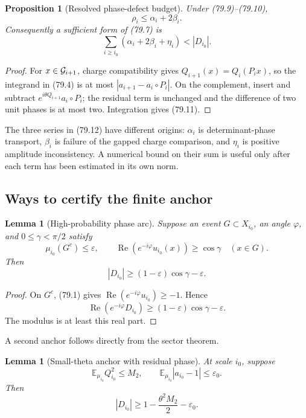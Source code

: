 \documentclass[11pt]{article}
\newtheorem{lemma}[theorem]{Lemma}
\newtheorem{proposition}[theorem]{Proposition}
\begin{document}
\begin{proposition}[Resolved phase-defect budget]
\label{prop:v11v79-budget}
Under (79.9)--(79.10),
\[
                                  \rho_i\le\alpha_i+2\beta_i. \tag{79.11}
\]
Consequently a sufficient form of (79.7) is
\[
       \sum_{i\ge i_0}(\alpha_i+2\beta_i+\eta_i)<|D_{i_0}|.  \tag{79.12}
\]
\end{proposition}

\begin{proof}
For \(x\in{\cal G}_{i+1}\), charge compatibility gives
\(Q_{i+1}(x)=Q_i(P_ix)\), so the integrand in (79.4) is at most
\(|a_{i+1}-a_i\circ P_i|\).  On the complement, insert and subtract
\(e^{i\theta Q_{i+1}}a_i\circ P_i\); the residual term is unchanged
and the difference of two unit phases is at most two.  Integration
gives (79.11).
\end{proof}

The three series in (79.12) have different origins:
\(\alpha_i\) is determinant-phase transport,
\(\beta_i\) is failure of the gapped charge comparison, and
\(\eta_i\) is positive amplitude inconsistency.  A numerical bound on
their sum is useful only after each term has been estimated in its
own norm.

\subsection{Ways to certify the finite anchor}

\begin{lemma}[High-probability phase arc]
\label{lem:v11v79-arc}
Suppose an event \(G\subset X_{i_0}\), an angle \(\varphi\), and
\(0\le\gamma<\pi/2\) satisfy
\[
 \mu_{i_0}(G^c)\le\varepsilon,\qquad
 \operatorname{Re}\!\left(e^{-i\varphi}u_{i_0}(x)\right)
                    \ge\cos\gamma\quad(x\in G).              \tag{79.13}
\]
Then
\[
 |D_{i_0}|
 \ge (1-\varepsilon)\cos\gamma-\varepsilon.                  \tag{79.14}
\]
\end{lemma}

\begin{proof}
On \(G^c\), (79.1) gives
\(\operatorname{Re}(e^{-i\varphi}u_{i_0})\ge-1\).  Hence
\[
 \operatorname{Re}(e^{-i\varphi}D_{i_0})
 \ge(1-\varepsilon)\cos\gamma-\varepsilon.
\]
The modulus is at least this real part.
\end{proof}

A second anchor follows directly from the sector theorem.

\begin{lemma}[Small-theta anchor with residual phase]
\label{lem:v11v79-theta}
At scale \(i_0\), suppose
\[
 \mathbb E_{\mu_{i_0}}Q_{i_0}^2\le M_2,\qquad
 \mathbb E_{\mu_{i_0}}|a_{i_0}-1|\le\varepsilon_0.            \tag{79.15}
\]
Then
\[
                 |D_{i_0}|
                 \ge1-\frac{\theta^2M_2}{2}-\varepsilon_0.   \tag{79.16}
\]
\end{lemma}
\end{document}
